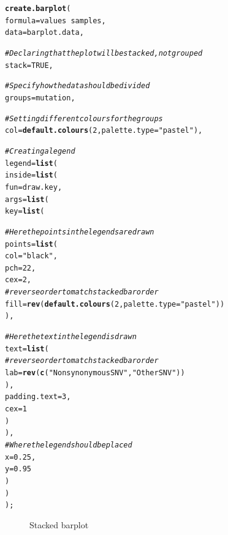 \documentclass[letterpaper]{article}\usepackage[]{graphicx}\usepackage[]{color}
\makeatletter
\newcommand{\hlnum}[1]{\textcolor[rgb]{0.686,0.059,0.569}{#1}}%
\newcommand{\hlstr}[1]{\textcolor[rgb]{0.192,0.494,0.8}{#1}}%
\newcommand{\hlcom}[1]{\textcolor[rgb]{0.678,0.584,0.686}{\textit{#1}}}%
\newcommand{\hlopt}[1]{\textcolor[rgb]{0,0,0}{#1}}%
\newcommand{\hlstd}[1]{\textcolor[rgb]{0.345,0.345,0.345}{#1}}%
\newcommand{\hlkwc}[1]{\textcolor[rgb]{0.333,0.667,0.333}{#1}}%
\newcommand{\hlkwd}[1]{\textcolor[rgb]{0.737,0.353,0.396}{\textbf{#1}}}%
\newenvironment{kframe}{%
 \def\at@end@of@kframe{}%
 \ifinner\ifhmode%
  \def\at@end@of@kframe{\end{minipage}}%
  \begin{minipage}{\columnwidth}%
 \fi\fi%
 \def\FrameCommand##1{\hskip\@totalleftmargin \hskip-\fboxsep
 \colorbox{shadecolor}{##1}\hskip-\fboxsep
     \hskip-\linewidth \hskip-\@totalleftmargin \hskip\columnwidth}%
 \MakeFramed {\advance\hsize-\width
   \@totalleftmargin\z@ \linewidth\hsize
   \@setminipage}}%
 {\par\unskip\endMakeFramed%
 \at@end@of@kframe}
\newenvironment{knitrout}{}{} %
\makeatother
\begin{document}
\begin{knitrout}
\color{fgcolor}\begin{kframe}
\begin{alltt}
\hlkwd{create.barplot}\hlstd{(}
    \hlkwc{formula} \hlstd{= values} \hlopt{~} \hlstd{samples,}
    \hlkwc{data} \hlstd{= barplot.data,}

    \hlcom{# Declaring that the plot will be stacked, not grouped}
    \hlkwc{stack} \hlstd{=} \hlnum{TRUE}\hlstd{,}

    \hlcom{# Specify how the data should be divided}
    \hlkwc{groups} \hlstd{= mutation,}

    \hlcom{# Setting different colours for the groups}
    \hlkwc{col} \hlstd{=} \hlkwd{default.colours}\hlstd{(}\hlnum{2}\hlstd{,} \hlkwc{palette.type} \hlstd{=} \hlstr{"pastel"}\hlstd{),}

    \hlcom{# Creating a legend }
    \hlkwc{legend} \hlstd{=} \hlkwd{list}\hlstd{(}
        \hlkwc{inside} \hlstd{=} \hlkwd{list}\hlstd{(}
            \hlkwc{fun} \hlstd{= draw.key,}
            \hlkwc{args} \hlstd{=} \hlkwd{list}\hlstd{(}
                \hlkwc{key} \hlstd{=} \hlkwd{list}\hlstd{(}

                    \hlcom{# Here the points in the legends are drawn}
                    \hlkwc{points} \hlstd{=} \hlkwd{list}\hlstd{(}
                        \hlkwc{col} \hlstd{=} \hlstr{"black"}\hlstd{,}
                        \hlkwc{pch} \hlstd{=} \hlnum{22}\hlstd{,}
                        \hlkwc{cex} \hlstd{=} \hlnum{2}\hlstd{,}
                        \hlcom{# reverse order to match stacked bar order}
                        \hlkwc{fill} \hlstd{=} \hlkwd{rev}\hlstd{(}\hlkwd{default.colours}\hlstd{(}\hlnum{2}\hlstd{,} \hlkwc{palette.type} \hlstd{=} \hlstr{"pastel"}\hlstd{))}
                        \hlstd{),}

                    \hlcom{# Here the text in the legend is drawn}
                    \hlkwc{text} \hlstd{=} \hlkwd{list}\hlstd{(}
                        \hlcom{# reverse order to match stacked bar order}
                        \hlkwc{lab} \hlstd{=} \hlkwd{rev}\hlstd{(}\hlkwd{c}\hlstd{(}\hlstr{"Nonsynonymous SNV"}\hlstd{,} \hlstr{"Other SNV"}\hlstd{))}
                        \hlstd{),}
                    \hlkwc{padding.text} \hlstd{=} \hlnum{3}\hlstd{,}
                    \hlkwc{cex} \hlstd{=} \hlnum{1}
                    \hlstd{)}
                \hlstd{),}
            \hlcom{# Where the legend should be placed}
            \hlkwc{x} \hlstd{=} \hlnum{0.25}\hlstd{,}
            \hlkwc{y} \hlstd{=} \hlnum{0.95}
            \hlstd{)}
        \hlstd{)}
    \hlstd{);}
\end{alltt}
\end{kframe}\begin{figure}[]


{\centering {} 

}

\caption[Stacked barplot]{Stacked barplot\label{fig:barplot3}}
\end{figure}


\end{knitrout}
\end{document}
